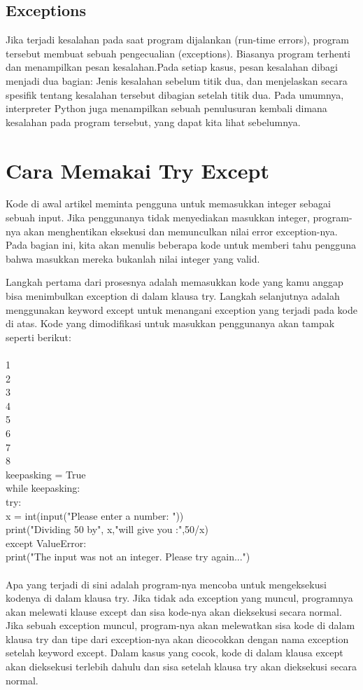 \subsection{Exceptions}
Jika terjadi kesalahan pada saat program dijalankan (run-time errors), program tersebut membuat sebuah pengecualian (exceptions). Biasanya program terhenti
dan menampilkan pesan kesalahan.Pada setiap kasus, pesan kesalahan dibagi menjadi dua bagian: Jenis kesalahan sebelum titik dua, dan menjelaskan secara spesifik tentang kesalahan tersebut
dibagian setelah titik dua. Pada umumnya, interpreter Python juga menampilkan sebuah penulusuran kembali dimana kesalahan pada program tersebut, yang dapat
kita lihat sebelumnya.

\section{Cara Memakai Try Except}
Kode di awal artikel meminta pengguna untuk memasukkan integer sebagai sebuah input. Jika penggunanya tidak menyediakan masukkan integer, program-nya akan menghentikan eksekusi dan memunculkan nilai error exception-nya. Pada bagian ini, kita akan menulis beberapa kode untuk memberi tahu pengguna bahwa masukkan mereka bukanlah nilai integer yang valid.

Langkah pertama dari prosesnya adalah memasukkan kode yang kamu anggap bisa menimbulkan exception di dalam klausa try. Langkah selanjutnya adalah menggunakan keyword except untuk menangani exception yang terjadi pada kode di atas. Kode yang dimodifikasi untuk masukkan penggunanya akan tampak seperti berikut:\\\\
1\\
2\\
3\\
4\\
5\\
6\\
7\\
8\\
keepasking = True\\ 
while keepasking:\\
    try:\\
        x = int(input("Please enter a number: "))\\
        print("Dividing 50 by", x,"will give you :",50/x)\\
    except ValueError:\\
        print("The input was not an integer. Please try again...")\\\\
Apa yang terjadi di sini adalah program-nya mencoba untuk mengeksekusi kodenya di dalam klausa try. Jika tidak ada exception yang muncul, programnya akan melewati klause except dan sisa kode-nya akan dieksekusi secara normal. Jika sebuah exception muncul, program-nya akan melewatkan sisa kode di dalam klausa try dan tipe dari exception-nya akan dicocokkan dengan nama exception setelah keyword except. Dalam kasus yang cocok, kode di dalam klausa except akan dieksekusi terlebih dahulu dan sisa setelah klausa try akan dieksekusi secara normal.

